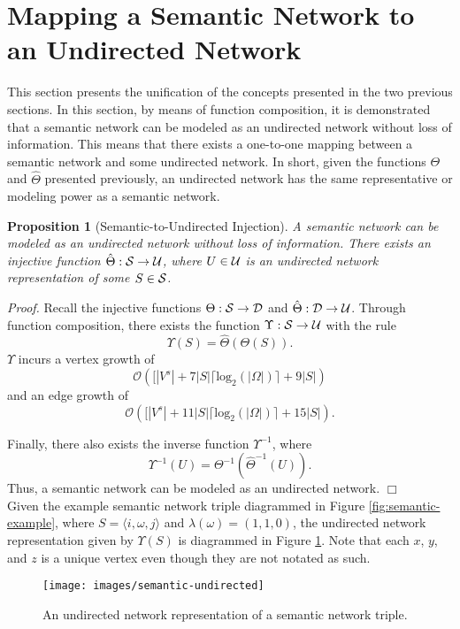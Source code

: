 \documentclass[twocolumn,preprintnumbers,amsmath,amssymb,letter]{revtex4}
\newcommand{\rar}{\rightarrow}
\newcommand{\ra}{\rangle}
\newcommand{\la}{\langle}
\newtheorem{proposition}{Proposition}
\newcommand{\qed}{\hfill $\Box$ \hfill \\}
\begin{document}
\section{Mapping a Semantic Network to an Undirected Network\label{sec:sem-to-und}}

This section presents the unification of the concepts presented in the two previous sections. In this section, by means of function composition, it is demonstrated that a semantic network can be modeled as an undirected network without loss of information. This means that there exists a one-to-one mapping between a semantic network and some undirected network. In short, given the functions $\Theta$ and $\hat{\Theta}$ presented previously, an undirected network has the same representative or modeling power as a semantic network.

\begin{proposition}[Semantic-to-Undirected Injection]
A semantic network can be modeled as an undirected network without loss of information. There exists an injective function $\hat{\Theta} : \cal{S} \rar \cal{U}$, where $U \in \cal{U}$ is an undirected network representation of some $S \in \cal{S}$.
\end{proposition}
\emph{Proof.} Recall the injective functions $\Theta : \cal{S} \rar \cal{D}$ and $\hat{\Theta} : \cal{D} \rar \cal{U}$. Through function composition, there exists the function $\Upsilon : \cal{S} \rar \cal{U}$ with the rule
\begin{equation*}
	\Upsilon(S) = \hat{\Theta}(\Theta(S)).
\end{equation*}
$\Upsilon$ incurs a vertex growth of 
\begin{equation*}
\mathcal{O}([|V^s| + 7|S|\lceil\text{log}_2(|\Omega|)\rceil + 9|S|)
\end{equation*}
and an edge growth of
\begin{equation*}
\mathcal{O}([|V^s| + 11|S|\lceil\text{log}_2(|\Omega|)\rceil + 15|S|). 
\end{equation*}


Finally, there also exists the inverse function $\Upsilon^{-1}$, where
\begin{equation*}
	\Upsilon^{-1}(U) = \Theta^{-1}(\hat{\Theta}^{-1}(U)).
\end{equation*}
Thus, a semantic network can be modeled as an undirected network. \qed

Given the example semantic network triple diagrammed in Figure \ref{fig:semantic-example}, where $S = \la i,\omega,j \ra$ and $\lambda(\omega) = (1,1,0)$, the undirected network representation given by $\Upsilon(S)$ is diagrammed in Figure \ref{fig:semantic-undirected}. Note that each $x$, $y$, and $z$ is a unique vertex even though they are not notated as such.
\begin{figure}[h!]
	\centering
	\texttt{[image: images/semantic-undirected]}
	 \caption{\label{fig:semantic-undirected}An undirected network representation of a semantic network triple.}
\end{figure}
\end{document}

